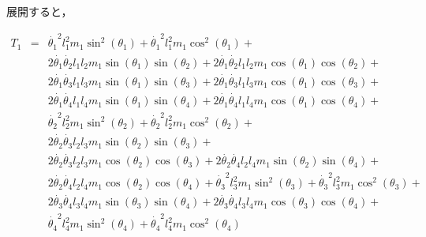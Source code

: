 展開すると，

\begin{eqnarray}
    T_1 &=& \dot{\theta_1}^{2} l_{1}^{2} m_{1} \sin^{2}{\left(\theta_1 \right)} + 
            \dot{\theta_1}^{2} l_{1}^{2} m_{1} \cos^{2}{\left(\theta_1 \right)} + \nonumber \\
        & & 2 \dot{\theta_1} \dot{\theta_2} l_{1} l_{2} m_{1} \sin{\left(\theta_1 \right)} \sin{\left(\theta_2 \right)} + 
            2 \dot{\theta_1} \dot{\theta_2} l_{1} l_{2} m_{1} \cos{\left(\theta_1 \right)} \cos{\left(\theta_2 \right)} + \nonumber \\
        & & 2 \dot{\theta_1} \dot{\theta_3} l_{1} l_{3} m_{1} \sin{\left(\theta_1 \right)} \sin{\left(\theta_3 \right)} + 
            2 \dot{\theta_1} \dot{\theta_3} l_{1} l_{3} m_{1} \cos{\left(\theta_1 \right)} \cos{\left(\theta_3 \right)} + \nonumber \\
        & & 2 \dot{\theta_1} \dot{\theta_4} l_{1} l_{4} m_{1} \sin{\left(\theta_1 \right)} \sin{\left(\theta_4 \right)} + 
            2 \dot{\theta_1} \dot{\theta_4} l_{1} l_{4} m_{1} \cos{\left(\theta_1 \right)} \cos{\left(\theta_4 \right)} + \nonumber \\
        & & \dot{\theta_2}^{2} l_{2}^{2} m_{1} \sin^{2}{\left(\theta_2 \right)} + 
            \dot{\theta_2}^{2} l_{2}^{2} m_{1} \cos^{2}{\left(\theta_2 \right)} + \nonumber \\
        & & 2 \dot{\theta_2} \dot{\theta_3} l_{2} l_{3} m_{1} \sin{\left(\theta_2 \right)} 
            \sin{\left(\theta_3 \right)} + \nonumber \\
        & & 2 \dot{\theta_2} \dot{\theta_3} l_{2} l_{3} m_{1} \cos{\left(\theta_2 \right)} \cos{\left(\theta_3 \right)} + 
            2 \dot{\theta_2} \dot{\theta_4} l_{2} l_{4} m_{1} \sin{\left(\theta_2 \right)} \sin{\left(\theta_4 \right)} + \nonumber \\
        & & 2 \dot{\theta_2} \dot{\theta_4} l_{2} l_{4} m_{1} \cos{\left(\theta_2 \right)} \cos{\left(\theta_4 \right)} + 
            \dot{\theta_3}^{2} l_{3}^{2} m_{1} \sin^{2}{\left(\theta_3 \right)} + \dot{\theta_3}^{2} l_{3}^{2} m_{1} \cos^{2}{\left(\theta_3 \right)} + \nonumber \\
        & & 2 \dot{\theta_3} \dot{\theta_4} l_{3} l_{4} m_{1} \sin{\left(\theta_3 \right)} \sin{\left(\theta_4 \right)} + 
            2 \dot{\theta_3} \dot{\theta_4} l_{3} l_{4} m_{1} \cos{\left(\theta_3 \right)} \cos{\left(\theta_4 \right)} + \nonumber \\
        & & \dot{\theta_4}^{2} l_{4}^{2} m_{1} \sin^{2}{\left(\theta_4 \right)} + \dot{\theta_4}^{2} l_{4}^{2} m_{1} \cos^{2}{\left(\theta_4 \right)}
\end{eqnarray}
